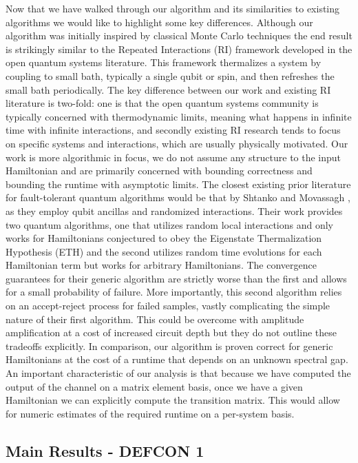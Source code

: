 \documentclass{article}
\begin{document}
Now that we have walked through our algorithm and its similarities to existing algorithms we would like to highlight some key differences. Although our algorithm was initially inspired by classical Monte Carlo techniques the end result is strikingly similar to the Repeated Interactions (RI) framework developed in the open quantum systems literature. This framework thermalizes a system by coupling to small bath, typically a single qubit or spin, and then refreshes the small bath periodically. The key difference between our work and existing RI literature is two-fold: one is that the open quantum systems community is typically concerned with thermodynamic limits, meaning what happens in infinite time with infinite interactions, and secondly existing RI research tends to focus on specific systems and interactions, which are usually physically motivated. Our work is more algorithmic in focus, we do not assume any structure to the input Hamiltonian and are primarily concerned with bounding correctness and bounding the runtime with asymptotic limits. The closest existing prior literature for fault-tolerant quantum algorithms would be that by Shtanko and Movassagh \cite{shtanko2023preparingthermalstatesnoiseless}, as they employ qubit ancillas and randomized interactions. Their work provides two quantum algorithms, one that utilizes random local interactions and only works for Hamiltonians conjectured to obey the Eigenstate Thermalization Hypothesis (ETH) and the second utilizes random time evolutions for each Hamiltonian term but works for arbitrary Hamiltonians. The convergence guarantees for their generic algorithm are strictly worse than the first and allows for a small probability of failure. More importantly, this second algorithm relies on an accept-reject process for failed samples, vastly complicating the simple nature of their first algorithm. This could be overcome with amplitude amplification at a cost of increased circuit depth but they do not outline these tradeoffs explicitly. In comparison, our algorithm is proven correct for generic Hamiltonians at the cost of a runtime that depends on an unknown spectral gap. An important characteristic of our analysis is that because we have computed the output of the channel on a matrix element basis, once we have a given Hamiltonian we can explicitly compute the transition matrix. This would allow for numeric estimates of the required runtime on a per-system basis. 

\subsection{Main Results - DEFCON 1}
\end{document}
